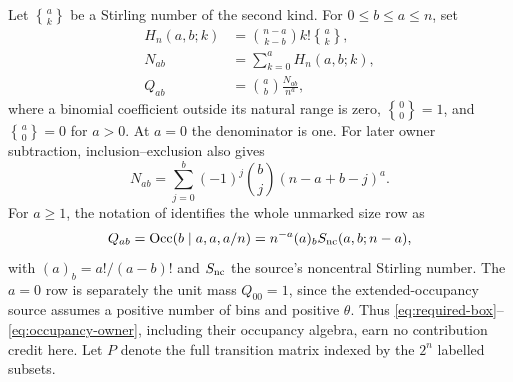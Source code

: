 \documentclass[a4paper,10pt]{amsart}
\theoremstyle{remark}
\newcommand{\Stir}[2]{\genfrac\{\}{0pt}{}{#1}{#2}}
\begin{document}
Let $\Stir ak$ be a Stirling number of the second kind.  For
$0\le b\le a\le n$, set
\begin{align}
H_n(a,b;k)&=\binom{n-a}{k-b}k!\Stir ak,                 \label{eq:H}\\
N_{ab}&=\sum_{k=0}^{a}H_n(a,b;k),                      \label{eq:N}\\
Q_{ab}&=\binom ab\frac{N_{ab}}{n^a},                  \label{eq:Q}
\end{align}
where a binomial coefficient outside its natural range is zero,
$\Stir00=1$, and $\Stir a0=0$ for $a>0$.  At $a=0$ the denominator is one.
For later owner subtraction, inclusion--exclusion also gives
\begin{equation}\label{eq:required-box}
 N_{ab}=\sum_{j=0}^{b}(-1)^j\binom bj(n-a+b-j)^a.
\end{equation}
For $a\ge1$, the notation of \citet{ONeill2023} identifies the whole
unmarked size row as
\begin{equation}\label{eq:occupancy-owner}
 Q_{ab}=\operatorname{Occ}(b\mid a,a,a/n)
       =n^{-a}(a)_b S_{\rm nc}(a,b;n-a),
\end{equation}
with $(a)_b=a!/(a-b)!$ and $S_{\rm nc}$ the source's noncentral Stirling
number.  The $a=0$ row is separately the unit mass $Q_{00}=1$, since the
extended-occupancy source assumes a positive number of bins and positive
$\theta$.  Thus \eqref{eq:required-box}--\eqref{eq:occupancy-owner}, including
their occupancy algebra, earn no contribution credit here.  Let $P$ denote
the full transition matrix indexed by the $2^n$ labelled subsets.
\end{document}
